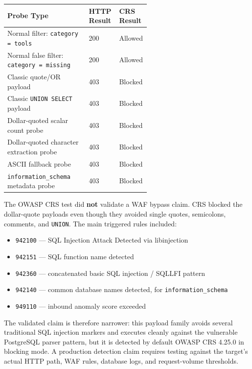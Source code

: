 \documentclass[11pt]{article}
\begin{document}
\begin{table}[h]
\centering
\small
\begin{tabular}{@{}>{\raggedright\arraybackslash}p{0.58\linewidth} l l@{}}
\toprule
Probe Type & HTTP Result & CRS Result \\
\midrule
Normal filter: \lstinline|category = tools|         & 200 & Allowed \\
Normal false filter: \lstinline|category = missing| & 200 & Allowed \\
Classic quote/OR payload                            & 403 & Blocked \\
Classic \lstinline|UNION SELECT| payload            & 403 & Blocked \\
Dollar-quoted scalar count probe                    & 403 & Blocked \\
Dollar-quoted character extraction probe            & 403 & Blocked \\
ASCII fallback probe                                & 403 & Blocked \\
\lstinline|information_schema| metadata probe       & 403 & Blocked \\
\bottomrule
\end{tabular}
\end{table}

The OWASP CRS test did \textbf{not} validate a WAF bypass claim. CRS blocked the
dollar-quote payloads even though they avoided single quotes, semicolons,
comments, and \lstinline|UNION|. The main triggered rules included:

\begin{itemize}[leftmargin=1.4em]
  \item \lstinline|942100| --- SQL Injection Attack Detected via libinjection
  \item \lstinline|942151| --- SQL function name detected
  \item \lstinline|942360| --- concatenated basic SQL injection / SQLLFI pattern
  \item \lstinline|942140| --- common database names detected, for
        \lstinline|information_schema|
  \item \lstinline|949110| --- inbound anomaly score exceeded
\end{itemize}

The validated claim is therefore narrower: this payload family avoids several
traditional SQL injection markers and executes cleanly against the vulnerable
PostgreSQL parser pattern, but it is detected by default OWASP CRS 4.25.0 in
blocking mode. A production detection claim requires testing against the target's
actual HTTP path, WAF rules, database logs, and request-volume thresholds.
\end{document}
